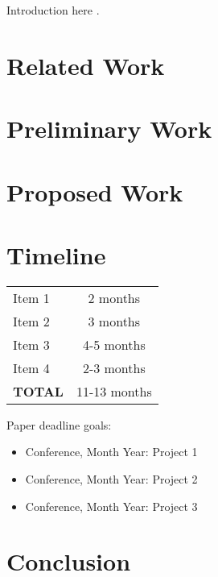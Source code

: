 \documentclass{article}
\begin{document}
Introduction here \cite{SourceYear}.



\section{Related Work}


\section{Preliminary Work}


\section{Proposed Work}


\section{Timeline}

\begin{center}
\begin{tabular}{|l|c|}
\hline
Item 1 & 2 months \\
Item 2 & 3 months \\
Item 3 & 4-5 months \\
Item 4 & 2-3 months \\
\hline
\textbf{TOTAL} & 11-13 months \\
\hline
\end{tabular}
\end{center}

Paper deadline goals:

\begin{itemize}
\item Conference, Month Year: Project 1
\item Conference, Month Year: Project 2
\item Conference, Month Year: Project 3
\end{itemize}


\section{Conclusion}
\end{document}
